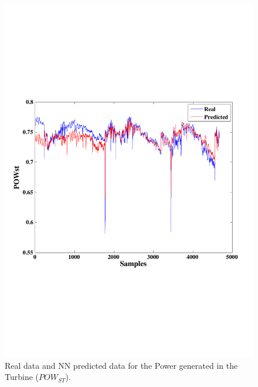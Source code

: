 \begin{figure}
\centering
\includegraphics[width=1\textwidth]{ANN-ST.pdf}
\caption{Real data and NN predicted data for the Power generated in the Turbine ($POW_{ST}$).}
\label{Pturbine}
\end{figure}

